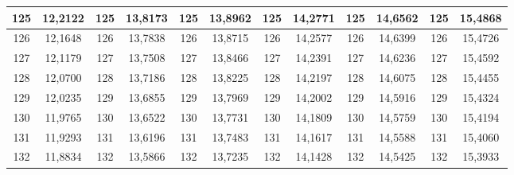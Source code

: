 \documentclass[a4paper,12pt]{article} %
\begin{document}
\begin{longtable}[c]{cccccccccc|c|c|}
	\multicolumn{1}{|c|}{125} & \multicolumn{1}{c|}{12,2122} & \multicolumn{1}{c|}{125} & \multicolumn{1}{c|}{13,8173} & \multicolumn{1}{c|}{125} & \multicolumn{1}{c|}{13,8962} & \multicolumn{1}{c|}{125} & \multicolumn{1}{c|}{14,2771} & \multicolumn{1}{c|}{125} & 14,6562 & 125 & 15,4868 \\ \hline
	\multicolumn{1}{|c|}{126} & \multicolumn{1}{c|}{12,1648} & \multicolumn{1}{c|}{126} & \multicolumn{1}{c|}{13,7838} & \multicolumn{1}{c|}{126} & \multicolumn{1}{c|}{13,8715} & \multicolumn{1}{c|}{126} & \multicolumn{1}{c|}{14,2577} & \multicolumn{1}{c|}{126} & 14,6399 & 126 & 15,4726 \\ \hline
	\multicolumn{1}{|c|}{127} & \multicolumn{1}{c|}{12,1179} & \multicolumn{1}{c|}{127} & \multicolumn{1}{c|}{13,7508} & \multicolumn{1}{c|}{127} & \multicolumn{1}{c|}{13,8466} & \multicolumn{1}{c|}{127} & \multicolumn{1}{c|}{14,2391} & \multicolumn{1}{c|}{127} & 14,6236 & 127 & 15,4592 \\ \hline
	\multicolumn{1}{|c|}{128} & \multicolumn{1}{c|}{12,0700} & \multicolumn{1}{c|}{128} & \multicolumn{1}{c|}{13,7186} & \multicolumn{1}{c|}{128} & \multicolumn{1}{c|}{13,8225} & \multicolumn{1}{c|}{128} & \multicolumn{1}{c|}{14,2197} & \multicolumn{1}{c|}{128} & 14,6075 & 128 & 15,4455 \\ \hline
	\multicolumn{1}{|c|}{129} & \multicolumn{1}{c|}{12,0235} & \multicolumn{1}{c|}{129} & \multicolumn{1}{c|}{13,6855} & \multicolumn{1}{c|}{129} & \multicolumn{1}{c|}{13,7969} & \multicolumn{1}{c|}{129} & \multicolumn{1}{c|}{14,2002} & \multicolumn{1}{c|}{129} & 14,5916 & 129 & 15,4324 \\ \hline
	\multicolumn{1}{|c|}{130} & \multicolumn{1}{c|}{11,9765} & \multicolumn{1}{c|}{130} & \multicolumn{1}{c|}{13,6522} & \multicolumn{1}{c|}{130} & \multicolumn{1}{c|}{13,7731} & \multicolumn{1}{c|}{130} & \multicolumn{1}{c|}{14,1809} & \multicolumn{1}{c|}{130} & 14,5759 & 130 & 15,4194 \\ \hline
	\multicolumn{1}{|c|}{131} & \multicolumn{1}{c|}{11,9293} & \multicolumn{1}{c|}{131} & \multicolumn{1}{c|}{13,6196} & \multicolumn{1}{c|}{131} & \multicolumn{1}{c|}{13,7483} & \multicolumn{1}{c|}{131} & \multicolumn{1}{c|}{14,1617} & \multicolumn{1}{c|}{131} & 14,5588 & 131 & 15,4060 \\ \hline
	\multicolumn{1}{|c|}{132} & \multicolumn{1}{c|}{11,8834} & \multicolumn{1}{c|}{132} & \multicolumn{1}{c|}{13,5866} & \multicolumn{1}{c|}{132} & \multicolumn{1}{c|}{13,7235} & \multicolumn{1}{c|}{132} & \multicolumn{1}{c|}{14,1428} & \multicolumn{1}{c|}{132} & 14,5425 & 132 & 15,3933 \\ \hline

\end{longtable}
\end{document}
